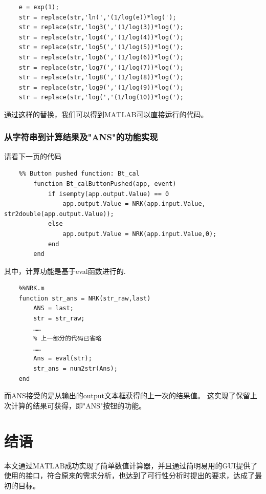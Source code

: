 \documentclass[AutoFakeBold]{LZUThesis}
\begin{document}
\begin{lstlisting}
    e = exp(1);
    str = replace(str,'ln(','(1/log(e))*log(');
    str = replace(str,'log3(','(1/log(3))*log(');
    str = replace(str,'log4(','(1/log(4))*log(');
    str = replace(str,'log5(','(1/log(5))*log(');
    str = replace(str,'log6(','(1/log(6))*log(');
    str = replace(str,'log7(','(1/log(7))*log(');
    str = replace(str,'log8(','(1/log(8))*log(');
    str = replace(str,'log9(','(1/log(9))*log(');
    str = replace(str,'log(','(1/log(10))*log(');
\end{lstlisting}

通过这样的替换，我们可以得到$\mathrm{MATLAB}$可以直接运行的代码。

\subsection{从字符串到计算结果及"ANS"的功能实现}

请看下一页的代码

\newpage
\begin{lstlisting}
    %% Button pushed function: Bt_cal
        function Bt_calButtonPushed(app, event)
            if isempty(app.output.Value) == 0
                app.output.Value = NRK(app.input.Value, str2double(app.output.Value));
            else
                app.output.Value = NRK(app.input.Value,0);
            end
        end
\end{lstlisting}

其中，计算功能是基于eval函数进行的.

\begin{lstlisting}
    %%NRK.m
    function str_ans = NRK(str_raw,last)
        ANS = last;
        str = str_raw;
        ……
        % 上一部分的代码已省略
        ……
        Ans = eval(str);
        str_ans = num2str(Ans);
    end
\end{lstlisting}

而ANS接受的是从输出的output文本框获得的上一次的结果值。
这实现了保留上次计算的结果可获得，即"ANS"按钮的功能。


\backmatter
\chapter{结语}
本文通过$\mathrm{MATLAB}$成功实现了简单数值计算器，并且通过简明易用的GUI提供了
使用的接口，符合原来的需求分析，也达到了可行性分析时提出的要求，达成了最初的目标。







\end{document}
